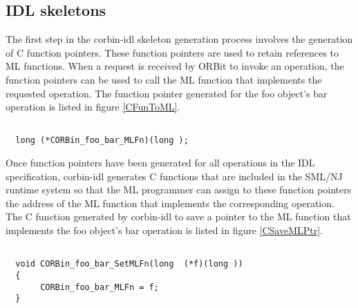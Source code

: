 \subsection*{IDL skeletons}

The first step in the corbin-idl skeleton generation process involves the 
generation of C function pointers.  These function pointers are used to 
retain references to ML functions.  When a request is received by 
ORBit to invoke an operation, the function pointers can be used 
to call the ML function that implements the requested operation. 
The function pointer generated for the foo object's bar operation is 
listed in figure \ref{CFunToML}.
\begin{figure*}[t]
\singlespace
\begin{verbatim}

  long (*CORBin_foo_bar_MLFn)(long );

\end{verbatim}
\doublespace
\caption {\em{C function pointer used to call the ML function that implements the foo object's bar operation}.}
\figline
        \label{CFunToML}
\end{figure*}

Once function pointers have been generated for all operations in the IDL
specification, corbin-idl generates C functions that are included in the 
SML/NJ runtime system so that the ML programmer can assign to these function 
pointers the address of the ML function that implements the corresponding 
operation. The C function generated by corbin-idl to save a pointer to 
the ML function that implements the foo object's bar operation is listed 
in figure \ref{CSaveMLPtr}.
\begin{figure*}[t]
\singlespace
\begin{verbatim}

  void CORBin_foo_bar_SetMLFn(long  (*f)(long ))
  {
       CORBin_foo_bar_MLFn = f;
  }

\end{verbatim}
\doublespace
\caption {\em{C function used to save a pointer to the ML function that implements the foo object's bar operation}.}
\figline
        \label{CSaveMLPtr}
\end{figure*}

